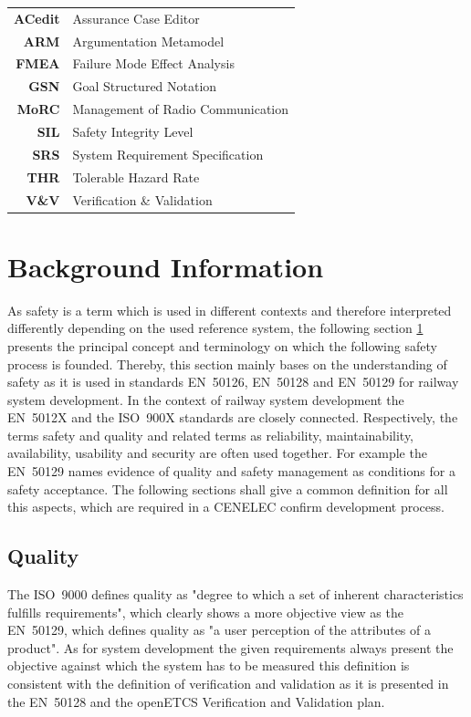 \documentclass{template/openetcs_report}
\begin{document}
\begin{tabular}{rl}
\textbf{ACedit} & Assurance Case Editor \\ 
\textbf{ARM} & Argumentation  Metamodel \\ 
\textbf{FMEA} & Failure Mode Effect Analysis \\ 
\textbf{GSN} & Goal Structured Notation \\ 
\textbf{MoRC} & Management of Radio Communication \\ 
\textbf{SIL} & Safety Integrity Level \\ 
\textbf{SRS} & System Requirement Specification \\ 
\textbf{THR} & Tolerable Hazard Rate \\ 
\textbf{V\&V} & Verification \& Validation \\ 
\end{tabular} 




\section{Background Information}
\label{sec:Background}

As safety is a term which is used in different contexts and therefore interpreted differently depending on the used reference system, the following section \ref{sec:Background} presents the principal concept and terminology on which the following safety process is founded. Thereby, this section mainly bases on the understanding of safety as it is used in standards EN~50126, EN~50128 and EN~50129 for railway system development. In the context of railway system development the EN~5012X and the ISO~900X standards are closely connected. Respectively, the terms safety and quality and related terms as reliability, maintainability, availability, usability and security are often used together. For example the EN~50129 names evidence of quality and safety management as conditions for a safety acceptance. The following sections shall give a common definition for all this aspects, which are required in a CENELEC confirm development process. 

\subsection{Quality}

The ISO~9000 defines quality as "degree to which a set of inherent characteristics fulfills requirements", which clearly shows a more objective view as the EN~50129, which defines quality as "a user perception of the attributes of a product". As for system development the given requirements always present the objective against which the system has to be measured this definition is consistent with the definition of verification and validation as it is presented in the EN~50128 and the openETCS Verification and Validation plan.
\end{document}
